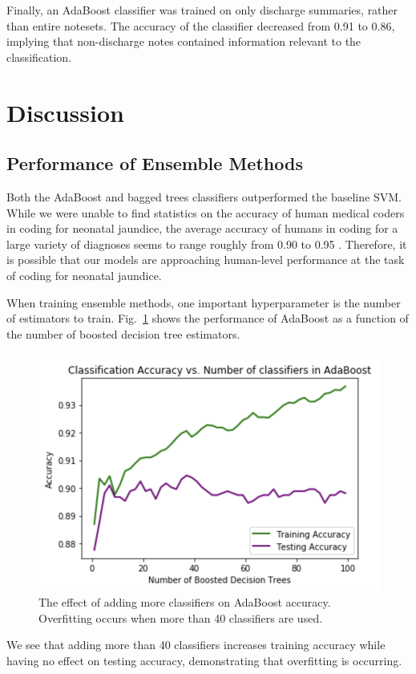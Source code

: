 \documentclass[conference]{IEEEtran}
\begin{document}
Finally, an AdaBoost classifier was trained on only discharge summaries, rather than entire notesets. The accuracy of the classifier decreased from 0.91 to 0.86, implying that non-discharge notes contained information relevant to the classification.
\section{Discussion}
\subsection{Performance of Ensemble Methods}
Both the AdaBoost and bagged trees classifiers outperformed the baseline SVM. While we were unable to find statistics on the accuracy of human medical coders in coding for neonatal jaundice, the average accuracy of humans in coding for a large variety of diagnoses seems to range roughly from 0.90 to 0.95 \cite{OMalley}. Therefore, it is possible that our models are approaching human-level performance at the task of coding for neonatal jaundice.

When training ensemble methods, one important hyperparameter is the number of estimators to train. Fig.~\ref{num} shows the performance of AdaBoost as a function of the number of boosted decision tree estimators.
\begin{figure}[htbp]
\centerline{\includegraphics[scale=0.6]{num_boosted}}
\caption{The effect of adding more classifiers on AdaBoost accuracy. Overfitting occurs when more than 40 classifiers are used.}
\label{num}
\end{figure}
We see that adding more than 40 classifiers increases training accuracy while having no effect on testing accuracy, demonstrating that overfitting is occurring.
\end{document}
